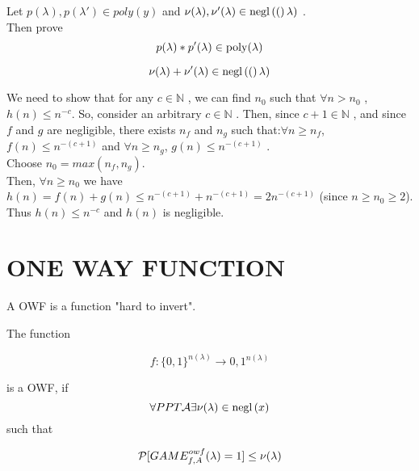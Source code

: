 \begin{exercise}
    

    Let
    $p( \lambda) , p( \lambda ') \in poly(y)$
    and 
    $\nu( \lambda), \nu'(\lambda) \in \negl (\lambda)$
      .\\
Then prove
    \begin{equation}
        p( \lambda) * p'( \lambda) \in  \poly(\lambda)
    \end{equation}
    
     
   \begin{equation}
        \nu( \lambda) + \nu ' ( \lambda)  \in \negl( \lambda) 
   \end{equation}
      
\end{exercise}

\begin{solution}[4.2]
   We need to show that for any $c \in \mathbb{N} $ , we can find $n_{0}$ such
   that $ \forall n >  n_{0} $ , $h(n) \leq n^{-c}$. So, consider an arbitrary
   $c \in \mathbb{N} $ .
Then, since $c+1 \in \mathbb{N} $ , and since $f$ and $g$ are negligible, there
exists $n_{f}$ and $n_{g}$ such that:$ \forall n \geq n_{f}$,
$f(n) \leq n^{-(c+1)}$ and $ \forall n \geq n_{g}$, $g(n) \leq n^{-(c+1)}$ .\\

Choose $n_{0}=max(n_{f}, n_{g})$.\\
Then, $ \forall n \geq  n_{0}$ we have $h(n)=f(n)+g(n) \leq n^{-(c+1)} +
n^{-(c+1)} = 2n^{-(c+1)}$ (since $n \geq n_{0} \geq 2$).
Thus $h(n) \leq n^{-c}$ and $h(n)$ is negligible.
\end{solution}


\section{ONE WAY FUNCTION}
A OWF is a function "hard to invert".
\begin{definition}
    
The function 

\begin{equation}
    f:\{0,1\}^{n(\lambda)} \to {0,1}^{n(\lambda)} 
\end{equation}

is a OWF, if 
\begin{equation}
    \forall  PPT  \A   \exists   \nu(\lambda) \in \negl{x}
\end{equation}
such that

\begin{equation}
    \P [ GAME_{f,A}^{owf} (\lambda)=1 ] \le \nu(\lambda)   
\end{equation}

\end{definition}


